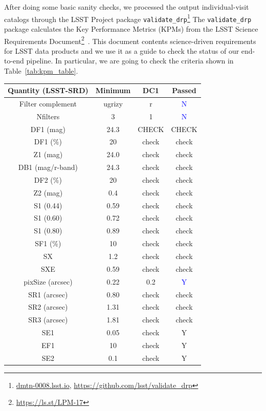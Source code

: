 \documentclass[twocolumn]{aastex62}
\begin{document}
After doing some basic sanity checks, we processed the output individual-visit catalogs through the LSST Project package \texttt{validate\_drp}\footnote{\url{dmtn-0008.lsst.io}, \url{https://github.com/lsst/validate_drp}}
The \texttt{validate\_drp} package calculates the Key Performance Metrics (KPMs) from the LSST Science Requirements Document\footnote{\url{https://ls.st/LPM-17}}~\citep[LSST-SRD;][]{LPM-17}. This document contents science-driven requirements for LSST data products and we use it as a guide to check the status of our end-to-end pipeline. In particular, we are going to check the criteria shown in Table~\ref{tab:kpm_table}.
\begin{table}[h]
\centering
\begin{tabular}{|c|c|c|c|}
\hline
Quantity (LSST-SRD) & Minimum & DC1 & Passed\\
\hline
Filter complement & ugrizy & r & \textcolor{blue}{N}\\
Nfilters & 3 & 1 & \textcolor{blue}{N}\\
DF1 (mag) & 24.3 & CHECK & CHECK\\
DF1 (\%) & 20 & check & check\\
Z1 (mag) & 24.0 & check & check\\
DB1 (mag/r-band) & 24.3 & check & check\\
DF2 (\%) & 20 & check & check\\
Z2 (mag) & 0.4 & check & check\\
S1 (0.44) & 0.59 & check & check\\
S1 (0.60) & 0.72 & check & check\\
S1 (0.80) & 0.89 & check & check\\
SF1 (\%) & 10 & check & check\\
SX & 1.2 & check & check\\
SXE & 0.59 & check & check\\
pixSize (arcsec) & 0.22 & 0.2 & \textcolor{blue}{Y}\\
SR1 (arcsec) & 0.80 & check & check\\
SR2 (arcsec) & 1.31 & check & check\\
SR3 (arcsec) & 1.81 & check & check\\
SE1 & 0.05 & check & Y\\
EF1 & 10 & check & Y\\
SE2 & 0.1 & check & Y\\

\end{tabular}
\end{table}
\end{document}
